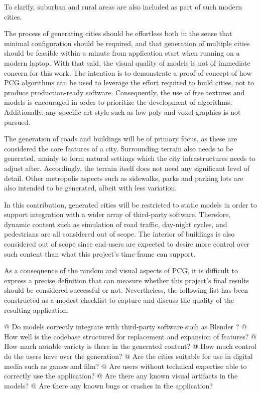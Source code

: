 To clarify, suburban and rural areas are also included as part of such modern cities.

The process of generating cities should be effortless both in the sense that minimal configuration should be required, and that generation of multiple cities should be feasible within a minute from application start when running on a modern laptop.
With that said, the visual quality of models is not of immediate concern for this work.
The intention is to demonstrate a proof of concept of how PCG algorithms can be used to leverage the effort required to build cities, not to produce production-ready software.
Consequently, the use of free textures and models is encouraged in order to prioritize the development of algorithms.
Additionally, any specific art style such as low poly \cite{lowpoly_wiki} and voxel graphics \cite{voxels_wiki} is not pursued.

The generation of roads and buildings will be of primary focus, as these are considered the core features of a city.
Surrounding terrain also needs to be generated, mainly to form natural settings which the city infrastructures needs to adjust after.
Accordingly, the terrain itself does not need any significant level of detail.
Other metropolis aspects such as sidewalks, parks and parking lots are also intended to be generated, albeit with less variation.

In this contribution, generated cities will be restricted to static models in order to support integration with a wider array of third-party software.
Therefore, dynamic content such as simulation of road traffic, day-night cycles, and pedestrians are all considered out of scope.
The interior of buildings is also considered out of scope since end-users are expected to desire more control over such content than what this project's time frame can support.

As a consequence of the random and visual aspects of PCG, it is difficult to express a precise definition that can measure whether this project's final results should be considered successful or not.
Nevertheless, the following list has been constructed as a modest checklist to capture and discuss the quality of the resulting application.

\begin{easylist}
  @ Do models correctly integrate with third-party software such as Blender \cite{blender}?
  @ How well is the codebase structured for replacement and expansion of features?
  @ How much notable variety is there in the generated content?
  @ How much control do the users have over the generation?
  @ Are the cities suitable for use in digital media such as games and film?
  @ Are users without technical expertise able to correctly use the application?
  @ Are there any known visual artifacts in the models?
  @ Are there any known bugs or crashes in the application?
\end{easylist}